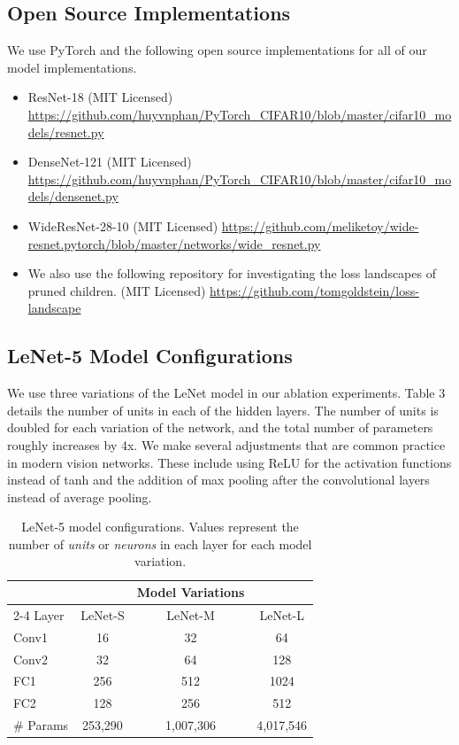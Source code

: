 \documentclass[letterpaper]{article} %
\begin{document}
\subsection{Open Source Implementations}

We use PyTorch and the following open source implementations for all of our model implementations.

\begin{itemize}
\item ResNet-18 (MIT Licensed) \url{https://github.com/huyvnphan/PyTorch_CIFAR10/blob/master/cifar10_models/resnet.py}

\item DenseNet-121 (MIT Licensed) \url{https://github.com/huyvnphan/PyTorch_CIFAR10/blob/master/cifar10_models/densenet.py}

\item WideResNet-28-10 (MIT Licensed) \url{https://github.com/meliketoy/wide-resnet.pytorch/blob/master/networks/wide_resnet.py}

\item We also use the following repository for investigating the loss landscapes of pruned children. (MIT Licensed) \url{https://github.com/tomgoldstein/loss-landscape}
\end{itemize}

\subsection{LeNet-5 Model Configurations}

We use three variations of the LeNet model in our ablation experiments. Table 3 details the number of units in each of the hidden layers. The number of units is doubled for each variation of the network, and the total number of parameters roughly increases by 4x. We make several adjustments that are common practice in modern vision networks. These include using ReLU for the activation functions instead of tanh and the  addition  of  max pooling after the convolutional layers instead of average pooling.

\begin{table}[t]
\centering
\begin{tabularx}{\columnwidth}{ X c c c } 
\toprule
 ~ & & Model Variations & \\
\cmidrule{2-4}
Layer & LeNet-S & LeNet-M & LeNet-L \\
\midrule
Conv1 &  16 & 32 & 64 \\ 
Conv2 &  32 & 64 & 128 \\
FC1 & 256 & 512 & 1024 \\
FC2 & 128 & 256 & 512 \\
\midrule
\# Params & 253,290 & 1,007,306 & 4,017,546 \\
\bottomrule
\end{tabularx}
\caption{LeNet-5 model configurations. Values represent the number of {\it units} or {\it neurons} in each layer for each model variation.}
\end{table}
\end{document}
